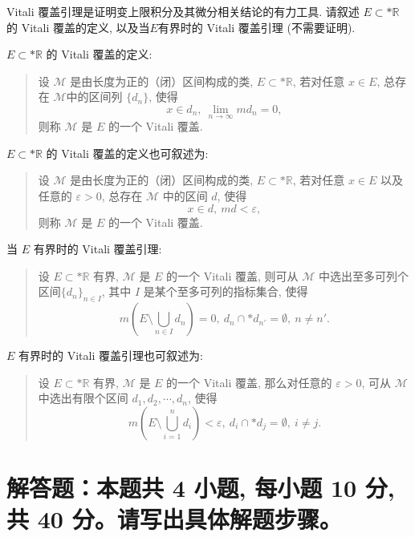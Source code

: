 \begin{question}[points = 10]
Vitali 覆盖引理是证明变上限积分及其微分相关结论的有力工具. 请叙述 $E\subset* \mathbb{R}$ 的 Vitali 覆盖的定义, 以及当$E$有界时的 Vitali 覆盖引理 (不需要证明).
\end{question}

\begin{solution}
\(E\subset* \mathbb{R}\) 的 Vitali 覆盖的定义: 

\begin{quote}
设 \(\mathscr{M}\) 是由长度为正的（闭）区间构成的类, \(E \subset* \mathbb{R}\), 若对任意 \(x \in E\), 总存在 \(\mathscr{M}\)中的区间列 \(\{d_n\}\), 使得
\[x \in d_n, ~ \lim\limits_{n\to\infty} m d_n = 0,\]
则称 \(\mathscr{M}\) 是 \(E\) 的一个 Vitali 覆盖.
\end{quote}

\(E\subset* \mathbb{R}\) 的 Vitali 覆盖的定义也可叙述为:

\begin{quote}
设 \(\mathscr{M}\) 是由长度为正的（闭）区间构成的类, \(E \subset* \mathbb{R}\), 若对任意 \(x \in E\) 以及任意的 \(\varepsilon > 0\), 总存在 \(\mathscr{M}\) 中的区间 \(d\), 使得
\[x \in d, ~ m d < \varepsilon,\]
则称 \(\mathscr{M}\) 是 \(E\) 的一个 Vitali 覆盖.
\end{quote}

当 \(E\) 有界时的 Vitali 覆盖引理: 

\begin{quote}
设 \(E \subset* \mathbb{R}\) 有界, \(\mathscr{M}\) 是 \(E\) 的一个 Vitali 覆盖, 则可从 \(\mathscr{M}\) 中选出至多可列个区间\(\{d_n\}_{n \in I}\), 其中 \(I\) 是某个至多可列的指标集合, 使得
\[m \left( E \setminus \bigcup\limits_{n \in I} d_n \right) = 0, ~ d_n \cap* d_{n'} = \emptyset, ~ n \neq n'.\]
\end{quote}

\(E\) 有界时的 Vitali 覆盖引理也可叙述为:

\begin{quote}
设 \(E \subset* \mathbb{R}\) 有界, \(\mathscr{M}\) 是 \(E\) 的一个 Vitali 覆盖, 那么对任意的 \(\varepsilon > 0\), 可从 \(\mathscr{M}\) 中选出有限个区间 \(d_1, d_2, \cdots, d_n\), 使得
\[m \left( E \setminus \bigcup\limits_{i=1}^n d_i \right) < \varepsilon, ~ d_i \cap* d_j = \emptyset, ~ i \neq j.\]
\end{quote}
\end{solution}


\section{解答题：本题共 4 小题, 每小题 10 分, 共 40 分。请写出具体解题步骤。}


